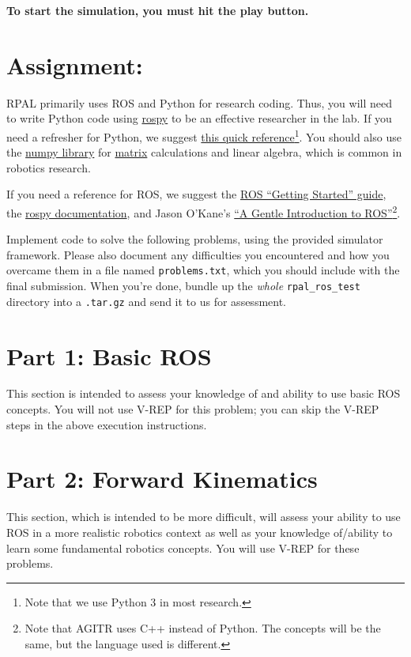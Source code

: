 \documentclass[11pt]{article}
\begin{document}
\textbf{To start the simulation, you must hit the play button.}

\section{Assignment:}

RPAL primarily uses ROS and Python for research coding. Thus, you will need to write Python code
using \href{http://wiki.ros.org/rospy}{rospy} to be an effective researcher in the lab. If you need
a refresher for Python, we suggest \href{https://learnxinyminutes.com/docs/python/}{this quick
reference}\footnote{Note that we use Python 3 in most research.}. You should also use the
\href{http://www.numpy.org/}{numpy library} for
\href{https://docs.scipy.org/doc/numpy-1.14.0/reference/generated/numpy.matrix.html}{matrix}
calculations and linear algebra, which is common in robotics research.

If you need a reference for ROS, we suggest the \href{http://wiki.ros.org/ROS/StartGuide}{ROS
``Getting Started'' guide}, the \href{http://wiki.ros.org/rospy}{rospy documentation}, and Jason
O'Kane's \href{https://cse.sc.edu/~jokane/agitr/agitr-letter.pdf}{``A Gentle Introduction to
ROS''}\footnote{Note that AGITR uses C++ instead of Python. The concepts will be the same, but the
language used is different.}.

Implement code to solve the following problems, using the provided simulator framework. Please also
document any difficulties you encountered and how you overcame them in a file named
\texttt{problems.txt}, which you should include with the final submission. When you're done, bundle
up the \emph{whole} \texttt{rpal\_ros\_test} directory into a \texttt{.tar.gz} and send it to us for
assessment.

\section{Part 1: Basic ROS}

This section is intended to assess your knowledge of and ability to use basic ROS concepts. You will
not use V-REP for this problem; you can skip the V-REP steps in the above execution instructions.






\section{Part 2: Forward Kinematics}

This section, which is intended to be more difficult, will assess your ability to use ROS in a more
realistic robotics context as well as your knowledge of/ability to learn some fundamental robotics
concepts. You will use V-REP for these problems.



\end{document}

